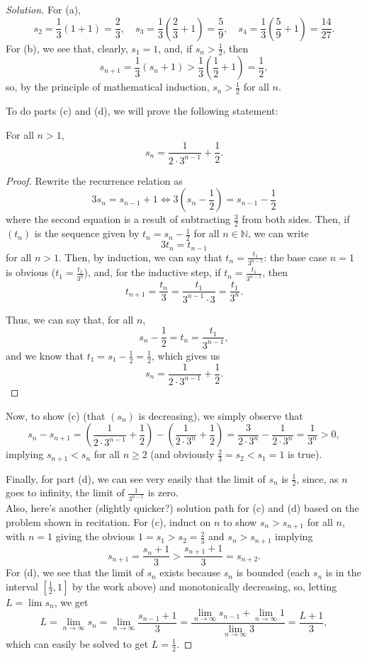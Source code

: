 \documentclass[11pt]{scrartcl}
\providecommand{\half}{\frac{1}{2}}
\providecommand{\NN}{\mathbb N}
\theoremstyle{problem}
\theoremstyle{remark}
\newenvironment{soln}{\begin{proof}[Solution]}{\end{proof}}
\begin{document}
\begin{soln}
	For (a),
	\[s_2 = \frac13(1 + 1) = \frac23,\quad
	s_3 = \frac13\left(\frac23+1\right) = \frac59,\quad
	s_4 = \frac13\left(\frac59 + 1\right) = \frac{14}{27}.\]
	For (b), we see that, clearly, $s_1 = 1$, and, if $s_n > \half$, then
	\[s_{n+1} = \frac13(s_n + 1) > \frac13\left(\half + 1\right) = \frac12,\]
	so, by the principle of mathematical induction, $s_n > \half$ for all $n$.
	
	To do parts (c) and (d), we will prove the following statement:
	\begin{claim*}
		For all $n > 1$,
		\[s_n = \frac{1}{2\cdot 3^{n-1}} + \half.\]
	\end{claim*}
	\begin{proof}
		Rewrite the recurrence relation as
		\[3s_n = s_{n-1} + 1 \iff 3\left(s_n - \half\right) = s_{n-1} - \half\]
		where the second equation is a result of subtracting $\frac32$
		from both sides.
		Then, if $(t_n)$ is the sequence given by $t_n = s_n - \half$
		for all $n\in\NN$, we can write
		\[3t_n = t_{n-1}\]
		for all $n > 1$.
		Then, by induction, we can say that $t_n = \frac{t_1}{3^{n-1}}$:
		the base case $n = 1$ is obvious ($t_1 = \frac{t_1}{3^0}$),
		and, for the inductive step, if $t_n = \frac{t_1}{3^{n-1}}$, then
		\[t_{n+1} = \frac{t_n}{3} = \frac{t_1}{3^{n-1}\cdot 3}
		= \frac{t_1}{3^n}.\]
		
		Thus, we can say that, for all $n$,
		\[s_n - \half = t_n = \frac{t_1}{3^{n-1}},\]
		and we know that $t_1 = s_1 - \half = \half$, which gives us
		\[s_n = \frac{1}{2\cdot 3^{n-1}} + \half.\]
	\end{proof}

	Now, to show (c) (that $(s_n)$ is decreasing), we simply observe that
	\[s_{n} - s_{n+1} =
	\left(\frac{1}{2\cdot 3^{n-1}} + \half\right) -
	\left(\frac{1}{2\cdot 3^n} + \half\right) =
	\frac{3}{2\cdot 3^{n}} - \frac{1}{2\cdot 3^{n}} =
	\frac{1}{3^{n}} > 0,\]
	implying $s_{n+1} < s_n$ for all $n \ge 2$ (and obviously
	$\frac23 = s_2 < s_1 = 1$ is true).
	
	Finally, for part (d),
	we can see very easily that the limit of $s_n$ is $\half$,
	since, as $n$ goes to infinity, the limit of $\frac{1}{3^{n-1}}$ is zero.\\
	
	Also, here's another (slightly quicker?) solution path for (c) and (d)
	based on the problem shown in recitation.
	For (c), induct on $n$ to show $s_n > s_{n+1}$ for all $n$,
	with $n=1$ giving the obvious $1 = s_1 > s_2 = \frac23$
	and $s_n > s_{n+1}$ implying
	\[s_{n+1} = \frac{s_n + 1}{3} > \frac{s_{n+1} + 1}{3} = s_{n+2}.\]
	For (d), we see that the limit of $s_n$ exists because $s_n$
	is bounded (each $s_n$ is in the interval $[\half, 1]$ by the work above)
	and monotonically decreasing, so, letting $L = \lim s_n$, we get
	\[L = \lim_{n\to\infty} s_n = \lim_{n\to\infty}\frac{s_{n-1} + 1}{3}
	= \frac{\lim_{n\to\infty} s_{n-1} + \lim_{n\to\infty} 1}
	{\lim_{n\to\infty}3} = \frac{L + 1}{3},\]
	which can easily be solved to get $L = \half$.
\end{soln}
\end{document}

